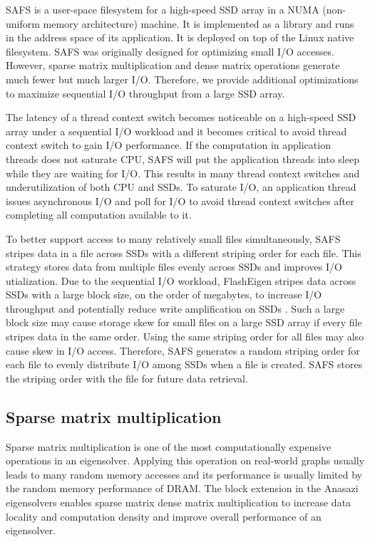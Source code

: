SAFS \cite{safs} is a user-space filesystem for a high-speed SSD array in
a NUMA (non-uniform memory architecture) machine. It is implemented as
a library and runs in the address space
of its application. It is deployed on top of the Linux native filesystem.
SAFS was originally designed for optimizing small I/O accesses. However,
sparse matrix multiplication and dense matrix operations
generate much fewer but much larger I/O. Therefore, we provide additional
optimizations to maximize sequential I/O throughput from a large SSD array.

The latency of a thread context switch becomes noticeable on a high-speed SSD
array under a sequential I/O workload and it becomes critical to avoid thread
context switch to gain I/O performance. If the computation in application
threads does not saturate CPU, SAFS will put the application threads into
sleep while they are waiting for I/O. This results in many thread context
switches and underutilization of both CPU and SSDs. To saturate I/O,
an application thread issues asynchronous I/O and poll for I/O to avoid thread
context switches after completing all computation available to it.

To better support access to many relatively small files simultaneously, SAFS
stripes data in a file across SSDs with a different striping order for each file.
This strategy stores data from multiple files evenly across SSDs and improves
I/O utialization. Due to the sequential I/O workload, FlashEigen stripes data
across SSDs with a large block size, on the order of megabytes, to increase I/O
throughput and potentially reduce write amplification on SSDs \cite{Tang15}.
Such a large block size may cause storage skew for small files
on a large SSD array if every file stripes data in the same order. Using
the same striping order for all files may also cause skew in I/O access.
Therefore, SAFS generates a random striping order for each file to evenly
distribute I/O among SSDs when a file is created. SAFS stores the striping
order with the file for future data retrieval.

\subsection{Sparse matrix multiplication} \label{spmm}
Sparse matrix multiplication is one of the most computationally expensive
operations in an eigensolver. Applying this operation on real-world graphs
usually leads to many random memory accesses and its performance is usually
limited by the random memory performance of DRAM. The block extension
in the Anasazi eigensolvers enables sparse matrix dense matrix multiplication
to increase data locality and computation density and improve overall performance
of an eigensolver.


